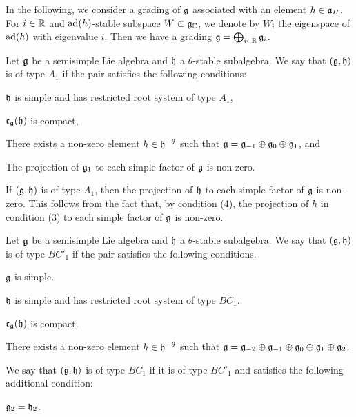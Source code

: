 In the following, we consider a grading of $\mathfrak{g}$ associated with an element $h \in \mathfrak{a}_H$.
For $i \in \mathbb{R}$ and $\mathrm{ad}(h)$-stable subspace $W \subset \mathfrak{g}_{\mathbb{C}}$, we denote by $W_i$ the eigenspace of $\mathrm{ad}(h)$ with eigenvalue $i$.
Then we have a grading $\mathfrak{g} = \bigoplus_{i \in \mathbb{R}} \mathfrak{g}_i$.

\begin{definition} \label{def:typeA}
	Let $\mathfrak{g}$ be a semisimple Lie algebra and $\mathfrak{h}$ a $\theta$-stable subalgebra.
	We say that $(\mathfrak{g}, \mathfrak{h})$ is of type $A_1$ if the pair satisfies the following conditions:
	\begin{enumparen}
		\item $\mathfrak{h}$ is simple and has restricted root system of type $A_1$,
		\item $\mathfrak{c}_{\mathfrak{g}}(\mathfrak{h})$ is compact,
		\item There exists a non-zero element $h \in \mathfrak{h}^{-\theta}$ such that $\mathfrak{g} = \mathfrak{g}_{-1} \oplus \mathfrak{g}_0 \oplus \mathfrak{g}_1$, and 
		\item The projection of $\mathfrak{g}_1$ to each simple factor of $\mathfrak{g}$ is non-zero.
	\end{enumparen}
\end{definition}

\begin{remark}
	If $(\mathfrak{g}, \mathfrak{h})$ is of type $A_1$, then the projection of $\mathfrak{h}$ to each simple factor of $\mathfrak{g}$ is non-zero.
	This follows from the fact that, by condition (4), the projection of $h$ in condition (3) to each simple factor of $\mathfrak{g}$ is non-zero.
\end{remark}

\begin{definition} \label{def:typeBC}
	Let $\mathfrak{g}$ be a semisimple Lie algebra and $\mathfrak{h}$ a $\theta$-stable subalgebra.
	We say that $(\mathfrak{g}, \mathfrak{h})$ is of type $BC'_1$ if the pair satisfies the following conditions.
	\begin{enumparen}
		\item $\mathfrak{g}$ is simple.
		\item $\mathfrak{h}$ is simple and has restricted root system of type $BC_1$.
		\item $\mathfrak{c}_{\mathfrak{g}}(\mathfrak{h})$ is compact.
		\item There exists a non-zero element $h \in \mathfrak{h}^{-\theta}$ such that $\mathfrak{g} = \mathfrak{g}_{-2} \oplus \mathfrak{g}_{-1} \oplus \mathfrak{g}_0 \oplus \mathfrak{g}_1 \oplus \mathfrak{g}_2$.
	\end{enumparen}
	We say that $(\mathfrak{g}, \mathfrak{h})$ is of type $BC_1$ if it is of type $BC'_1$ and satisfies the following additional condition:
	\begin{enumparen} \setcounter{enumi}{4}
		\item $\mathfrak{g}_2 = \mathfrak{h}_2$.
	\end{enumparen}
\end{definition}

